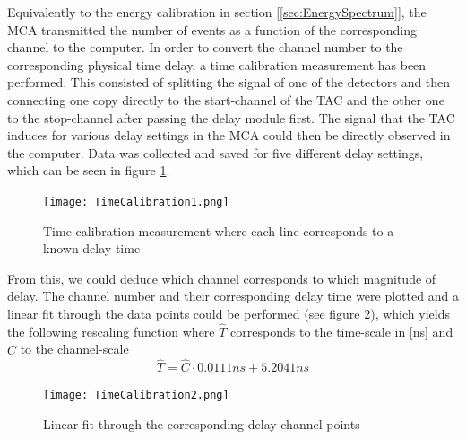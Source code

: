 \documentclass[a4paper,parskip,11pt, DIV12]{scrreprt}
\begin{document}
		Equivalently to the energy calibration in section [\ref{sec:EnergySpectrum}], the MCA transmitted the number of events as a function of the corresponding channel to the computer. In order to convert the channel number to the corresponding physical time delay, a time calibration measurement has been performed. This consisted of splitting the signal of one of the detectors and then connecting one copy directly to the start-channel of the TAC and the other one to the stop-channel after passing the delay module first. The signal that the TAC induces for various delay settings in the MCA could then be directly observed in the computer. Data was collected and saved for five different delay settings, which can be seen in figure \ref{fig:TimeCal1}.
		\begin{figure}[H]
\centering
\texttt{[image: TimeCalibration1.png]}
\caption[TimeCalibration1]{Time calibration measurement where each line corresponds to a known delay time}
\label{fig:TimeCal1}
	\end{figure}
	From this, we could deduce which channel corresponds to which magnitude of delay. The channel number and their corresponding delay time were plotted and a linear fit through the data points could be performed (see figure \ref{fig:TimeCal2}), which yields the following rescaling function where $\hat{T}$ corresponds to the time-scale in [ns] and $\hat{C}$ to the channel-scale
	\begin{equation}
	\hat{T} = \hat{C} \cdot 0.0111ns + 5.2041ns 
	\end{equation}
	\begin{figure}[H]
\centering
\texttt{[image: TimeCalibration2.png]}
\caption[TimeCalibration2]{Linear fit through the corresponding delay-channel-points}
\label{fig:TimeCal2}
	\end{figure}
\end{document}
